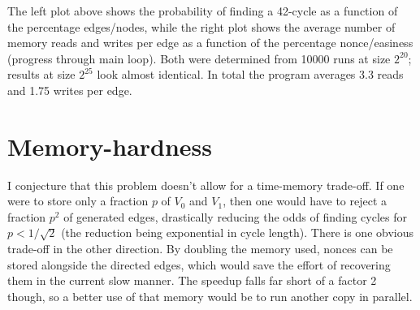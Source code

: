 \documentclass[11pt, oneside]{article}
\begin{document}
\begin{center}
\end{center}

The left plot above shows the probability of finding a 42-cycle as a function of the percentage edges/nodes,
while the right plot shows the average number of memory reads and writes per edge as a function of the percentage
nonce/easiness (progress through main loop). Both were determined from 10000 runs at size $2^{20}$;
results at size $2^{25}$ look almost identical.
In total the program averages 3.3 reads and 1.75 writes per edge.

\section{Memory-hardness}
I conjecture that this problem doesn't allow for a time-memory trade-off. If
one were to store only a fraction $p$ of $V_0$ and $V_1$, then one would have
to reject a fraction $p^2$ of generated edges, drastically reducing the odds of
finding cycles for $p<1/\sqrt{2}$ (the reduction being exponential in cycle length).
There is one obvious trade-off in the other direction. By doubling the memory
used, nonces can be stored alongside the directed edges, which would save the
effort of recovering them in the current slow manner. The speedup falls far
short of a factor 2 though, so a better use of that memory would be to run
another copy in parallel.
\end{document}
